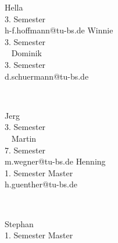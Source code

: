 {Hella\\3. Semester\\h-f.hoffmann@tu-bs.de}
\hfill
{}
{Winnie\\3. Semester\\ ~}
\hfill
{}
{Dominik\\3. Semester\\d.schuermann@tu-bs.de}
\par \ \par
{}
{Jerg\\3. Semester\\ ~}
\hfill
{}
{Martin\\7. Semester\\ m.wegner@tu-bs.de}
\hfill
{}
{Henning\\1. Semester Master\\h.guenther@tu-bs.de}
\par \ \par
{}
{Stephan\\1. Semester Master\\ ~}

\twocolumn